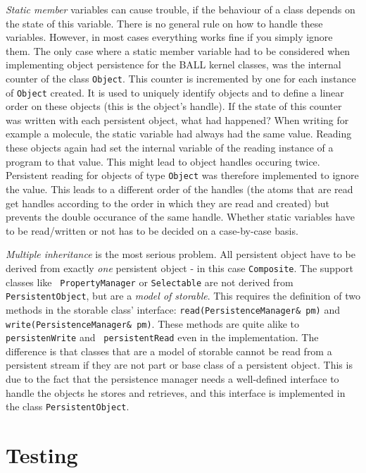 \documentclass[a4paper,10pt]{article}
\begin{document}
{\em Static member} variables can cause trouble, if the behaviour of a class depends
on the state of this variable. There is no general rule on how to handle these
variables. However, in most cases everything works fine if you simply ignore
them. The only case where a static member variable had to be considered when
implementing object persistence for the BALL kernel classes, was the internal
counter of the class {\tt Object}. This counter is incremented by one for each
instance of {\tt Object} created. It is used to uniquely identify objects and
to define a linear order on these objects (this is the object's handle).
If the state of this counter was written with each persistent object, what
had happened? When writing for example a molecule, the static variable had
always had the same value. Reading these objects again had set the internal
variable of the reading instance of a program to that value. This might lead
to object handles occuring twice. Persistent reading for objects of type {\tt Object} 
was therefore implemented to ignore the value. This leads to a different order
of the handles (the atoms that are read get handles according to the order in
which they are read and created) but prevents the double occurance of the same
handle. Whether static variables have to be read/written or not has to be
decided  on a case-by-case basis.

{\em Multiple inheritance} is the most serious problem. 
All persistent object have to be derived from exactly {\em one} persistent
object - in this case {\tt Composite}. The support classes like {\tt
PropertyManager} or {\tt Selectable} are not derived from {\tt
PersistentObject}, but are a {\em model of storable}. 
This requires the definition of two methods in the storable class' interface:
{\tt read(PersistenceManager\& pm)} and {\tt write(PersistenceManager\& pm)}.
These methods are quite alike to {\tt persistenWrite} and {\tt
persistentRead} even in the implementation. The difference is that classes
that are a model of storable cannot be read from a persistent stream if they
are not part or base class of a persistent object. This is due to the fact
that the persistence manager needs a well-defined interface to handle the
objects he stores and retrieves, and this interface is implemented in the class
{\tt PersistentObject}. 

\section{Testing}
\end{document}
